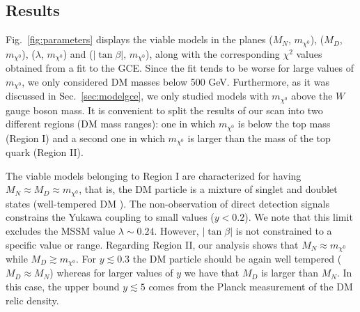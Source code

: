 \subsection{Results}
\label{subsec:Results}
Fig.~\ref{fig:parameters} displays the viable models in the planes ($M_N$, $m_{\chi^0}$),  ($M_D$, $m_{\chi^0}$),  ($\lambda$, $m_{\chi^0}$) and  ($|\tan\beta|$, $m_{\chi^0}$), along with the corresponding $\chi^2$ values obtained from a fit to the GCE. 
Since the fit tends to be worse for large values of $m_{\chi^0}$, we only considered DM masses  below 500 GeV. 
Furthermore, as it was discussed in Sec.~\ref{sec:modelgce}, we only studied models with $m_{\chi^0}$ above the $W$ gauge boson mass. 
It is convenient to split the results of our scan into two different regions (DM mass ranges): one in which $m_{\chi^0}$ is below the top mass (Region I) and a second one in which $m_{\chi^0}$ is larger than the mass of the top quark (Region II).  

The viable models belonging to Region I are characterized for having  $M_N\approx M_D\approx m_{\chi^0}$, that is, the DM particle is a mixture of singlet and doublet states (well-tempered DM \cite{ArkaniHamed:2006mb,Cheung:2013dua}). 
The non-observation of direct detection signals constrains the Yukawa coupling to small values ($y<0.2$). We note that this limit excludes the MSSM value $\lambda \sim 0.24$. However, $|\tan\beta|$ is not constrained to a specific value or range. 
Regarding Region II, our analysis shows that $M_N\approx m_{\chi^0}$ while $M_D\gtrsim m_{\chi^0}$. For $y\lesssim 0.3$ the DM particle should be again well tempered ($M_D\approx M_N$) whereas for larger values of $y$ we have that $M_D$ is larger than $M_N$.      
In this case, the upper bound $y\lesssim 5$ comes from the Planck measurement of the DM relic density.

